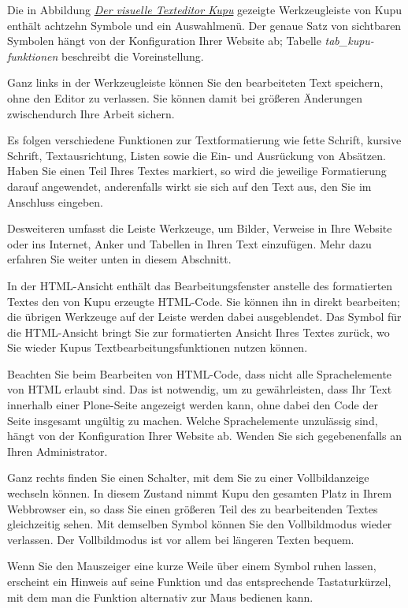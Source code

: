 \documentclass[a4paper,12pt,ngerman]{manual}
\begin{document}
Die in Abbildung \hyperlink{fig-kupu}{\emph{Der visuelle Texteditor Kupu}} gezeigte Werkzeugleiste von
Kupu enthält achtzehn Symbole und ein Auswahlmenü. Der genaue Satz von
sichtbaren Symbolen hängt von der Konfiguration Ihrer Website ab;
Tabelle \emph{tab\_kupu-funktionen} beschreibt die Voreinstellung.



Ganz links in der Werkzeugleiste können Sie den bearbeiteten Text speichern,
ohne den Editor zu verlassen. Sie können damit bei größeren Änderungen
zwischendurch Ihre Arbeit sichern.

Es folgen verschiedene Funktionen zur Textformatierung wie fette Schrift,
kursive Schrift, Textausrichtung, Listen sowie die Ein- und Ausrückung von
Absätzen. Haben Sie einen Teil Ihres Textes markiert, so wird die jeweilige
Formatierung darauf angewendet, anderenfalls wirkt sie sich auf den Text aus,
den Sie im Anschluss eingeben.

Desweiteren umfasst die Leiste Werkzeuge, um Bilder, Verweise in Ihre Website
oder ins Internet, Anker und Tabellen in Ihren Text einzufügen. Mehr dazu
erfahren Sie weiter unten in diesem Abschnitt.

In der HTML-Ansicht enthält das Bearbeitungsfenster anstelle des formatierten
Textes den von Kupu erzeugte HTML-Code. Sie können ihn
in direkt bearbeiten; die übrigen Werkzeuge auf der Leiste
werden dabei ausgeblendet. Das Symbol für die HTML-Ansicht bringt Sie zur
formatierten Ansicht Ihres Textes zurück, wo Sie wieder Kupus
Textbearbeitungsfunktionen nutzen können.

Beachten Sie beim Bearbeiten von HTML-Code, dass nicht alle Sprachelemente
von HTML erlaubt sind. Das ist notwendig, um zu gewährleisten, dass Ihr Text
innerhalb einer Plone-Seite angezeigt werden kann, ohne dabei den Code der
Seite insgesamt ungültig zu machen. Welche Sprachelemente unzulässig sind,
hängt von der Konfiguration Ihrer Website ab. Wenden Sie sich gegebenenfalls
an Ihren Administrator.

Ganz rechts finden Sie einen Schalter, mit dem Sie zu einer Vollbildanzeige
wechseln können. In diesem Zustand nimmt Kupu den gesamten Platz in Ihrem
Webbrowser ein, so dass Sie einen größeren Teil des zu bearbeitenden Textes
gleichzeitig sehen. Mit demselben Symbol können Sie den Vollbildmodus wieder
verlassen. Der Vollbildmodus ist vor allem bei längeren Texten bequem.

Wenn Sie den Mauszeiger eine kurze Weile über einem Symbol ruhen lassen,
erscheint ein Hinweis auf seine Funktion und das entsprechende Tastaturkürzel,
mit dem man die Funktion alternativ zur Maus bedienen kann.
\end{document}
